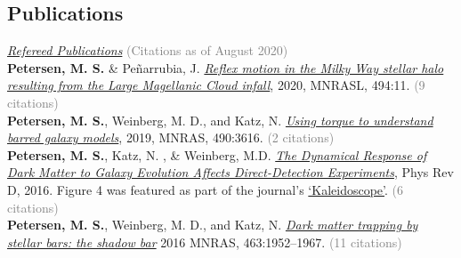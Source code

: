 \documentclass[margin, 11pt]{res} %
\begin{document}
\begin{resume}
\section{\sc \textcolor{redshade}{Publications} }
 \underline{\sl Refereed Publications} \textcolor{grey}{(Citations as of August 2020)} \\
{\bf \textcolor{blueshade}{Petersen, M. S.}} \& Pe{\~n}arrubia, J. \href{https://ui.adsabs.harvard.edu/abs/2020MNRAS.494L..11P/abstract}{\it Reflex motion in the Milky Way stellar halo resulting from the Large Magellanic Cloud infall}, 2020, MNRASL, 494:11. \textcolor{grey}{(9 citations)}\\ %
{\bf \textcolor{blueshade}{Petersen, M. S.}}, Weinberg, M. D., and Katz, N. \href{https://ui.adsabs.harvard.edu/abs/2019MNRAS.490.3616P/abstract}{\it Using torque to understand barred galaxy models}, 2019, MNRAS, 490:3616. \textcolor{grey}{(2 citations)}\\
{\bf \textcolor{blueshade}{Petersen, M. S.}}, Katz, N. , \& Weinberg, M.D. \href{http://adsabs.harvard.edu/abs/2016PhRvD..94l3013P}{{\it The Dynamical Response of Dark Matter to Galaxy Evolution Affects Direct-Detection Experiments}}, Phys Rev D, 2016. Figure 4 was featured as part of the journal's \href{https://journals.aps.org/prd/kaleidoscope/prd/94/12/123013}{`Kaleidoscope'}. \textcolor{grey}{(6 citations)}\\
{\bf \textcolor{blueshade}{Petersen, M. S.}}, Weinberg, M. D., and Katz, N. \href{http://adsabs.harvard.edu/abs/2016MNRAS.463.1952P}{{\it  Dark matter trapping by stellar bars: the shadow bar}} 2016 MNRAS, 463:1952–1967. \textcolor{grey}{(11 citations)}\\


\end{resume}
\end{document}

